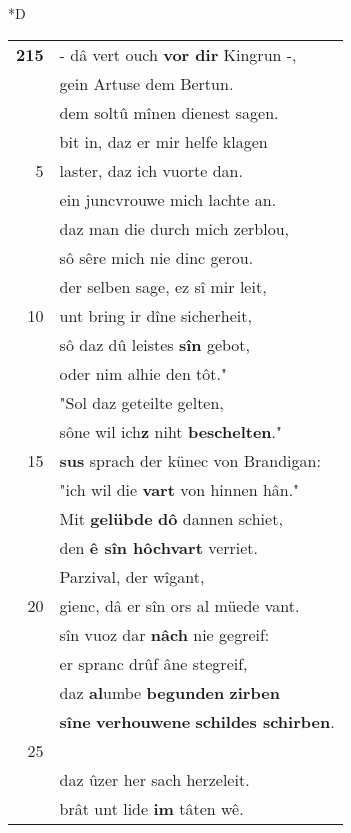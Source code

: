 \documentclass[8pt,a4paper,notitlepage]{article}
\begin{document}
\begin{table}[ht]
\begin{minipage}[t]{0.5\linewidth}
\small
\begin{center}*D
\end{center}
\begin{tabular}{rl}
\textbf{215} & - dâ vert ouch \textbf{vor dir} Kingrun -,\\ 
 & gein Artuse dem Bertun.\\ 
 & dem soltû mînen dienest sagen.\\ 
 & bit in, daz er mir helfe klagen\\ 
5 & laster, daz ich vuorte dan.\\ 
 & ein juncvrouwe mich lachte an.\\ 
 & daz man die durch mich zerblou,\\ 
 & sô sêre mich nie dinc gerou.\\ 
 & der selben sage, ez sî mir leit,\\ 
10 & unt bring ir dîne sicherheit,\\ 
 & sô daz dû leistes \textbf{sîn} gebot,\\ 
 & oder nim alhie den tôt."\\ 
 & "Sol daz geteilte gelten,\\ 
 & sône wil ich\textbf{z} niht \textbf{beschelten}."\\ 
15 & \textbf{sus} sprach der künec von Brandigan:\\ 
 & "ich wil die \textbf{vart} von hinnen hân."\\ 
 & Mit \textbf{gelübde} \textbf{dô} dannen schiet,\\ 
 & den \textbf{ê sîn hôchvart} verriet.\\ 
 & Parzival, der wîgant,\\ 
20 & gienc, dâ er sîn ors al müede vant.\\ 
 & sîn vuoz dar \textbf{nâch} nie gegreif:\\ 
 & er spranc drûf âne stegreif,\\ 
 & daz \textbf{al}umbe \textbf{begunden} \textbf{zirben}\\ 
 & \textbf{sîne} \textbf{verhouwene} \textbf{schildes schirben}.\\ 
25 & \textbf{\begin{large}D\end{large}es} wâren die burgære gemeit.\\ 
 & daz ûzer her sach herzeleit.\\ 
 & brât unt lide \textbf{im} tâten wê.\\ 

\end{tabular}
\end{minipage}
\end{table}
\end{document}

